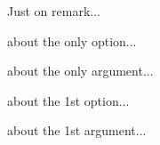 \documentclass[12pt,a4paper]{article}
\begin{document}
\begin{remark}
	Just on remark...
\end{remark}





\IDoption{} about the only option...

\IDarg{} about the only argument...

 about the 1st option...

 about the 1st argument...
\end{document}
